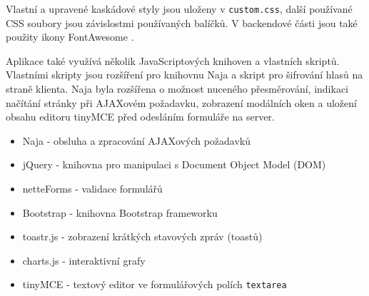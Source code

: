 Vlastní a upravené kaskádové styly jsou uloženy v \texttt{custom.css}, další používané CSS soubory jsou závislostmi používaných balíčků. V backendové části jsou také použity ikony FontAwesome \cite{FontAwesome}.


Aplikace také využívá několik JavaScriptových knihoven a vlastních skriptů. Vlastními skripty jsou rozšíření pro knihovnu Naja a skript pro šifrování hlasů na straně klienta. Naja byla rozšířena o možnost nuceného přesměrování, indikaci načítání stránky při AJAXovém požadavku, zobrazení modálních oken a uložení obsahu editoru tinyMCE před odesláním formuláře na server.
\begin{itemize}
	\item Naja - obsluha a zpracování AJAXových požadavků
	\item jQuery - knihovna pro manipulaci s Document Object Model (DOM)
	\item netteForms - validace formulářů
	\item Bootstrap - knihovna Bootstrap frameworku
	\item toastr.js - zobrazení krátkých stavových zpráv (toastů)
	\item charts.js - interaktivní grafy
	\item tinyMCE - textový editor ve formulářových polích \texttt{textarea}
\end{itemize}
